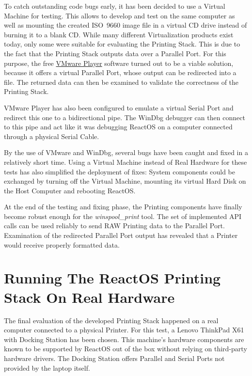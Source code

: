 To catch outstanding code bugs early, it has been decided to use a Virtual Machine for testing.
This allows to develop and test on the same computer as well as mounting the created ISO~9660 image file in a virtual CD drive instead of burning it to a blank CD.
While many different Virtualization products exist today, only some were suitable for evaluating the Printing Stack.
This is due to the fact that the Printing Stack outputs data over a Parallel Port.
For this purpose, the free \href{http://www.vmware.com/products/player}{VMware Player} software turned out to be a viable solution, because it offers a virtual Parallel Port, whose output can be redirected into a file.
The returned data can then be examined to validate the correctness of the Printing Stack.

VMware Player has also been configured to emulate a virtual Serial Port and redirect this one to a bidirectional pipe.
The WinDbg debugger can then connect to this pipe and act like it was debugging ReactOS on a computer connected through a physical Serial Cable.

By the use of VMware and WinDbg, several bugs have been caught and fixed in a relatively short time.
Using a Virtual Machine instead of Real Hardware for these tests has also simplified the deployment of fixes:
System components could be exchanged by turning off the Virtual Machine, mounting its virtual Hard Disk on the Host Computer and rebooting ReactOS.

At the end of the testing and fixing phase, the Printing components have finally become robust enough for the \emph{winspool\_print} tool.
The set of implemented \gls{API} calls can be used reliably to send RAW Printing data to the Parallel Port.
Examination of the redirected Parallel Port output has revealed that a Printer would receive properly formatted data.


\section{Running The ReactOS Printing Stack On Real Hardware}
The final evaluation of the developed Printing Stack happened on a real computer connected to a physical Printer.
For this test, a Lenovo ThinkPad X61 with Docking Station has been chosen.
This machine's hardware components are known to be supported by ReactOS out of the box without relying on third-party hardware drivers.
The Docking Station offers Parallel and Serial Ports not provided by the laptop itself.

